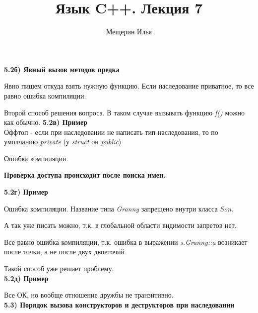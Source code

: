\documentclass{article}
\title{Язык C++. Лекция 7}
\author{Мещерин Илья}
\date{\DTMdate{2018-10-29}}
\begin{document}
\maketitle

\noindent \textbf{5.2б) Явный вызов методов предка}

Явно пишем откуда взять нужную функцию. Если наследование приватное, то все равно ошибка компиляции.

Второй способ решения вопроса. В таком случае вызывать функцию \textit{f()} можно как обычно.
\noindent \textbf{5.2в) Пример}\\
Оффтоп - если при наследовании не написать тип наследования, то по умолчанию \textit{private} (у \textit{struct} он \textit{public})

Ошибка компиляции.\begin{large}
	\textbf{Проверка доступа происходит после поиска имен.}
\end{large}
\noindent \textbf{5.2г) Пример}

Ошибка компиляции. Название типа \textit{Granny} запрещено внутри класса \textit{Son}.

А так уже писать можно, т.к. в глобальной области видимости запретов нет.

Все равно ошибка компиляции, т.к. ошибка в выражении \textit{s.Granny::a} возникает после точки, а не после двух двоеточий.

Такой способ уже решает проблему.\\
\noindent \textbf{5.2д) Пример}

Все ОК, но вообще отношение дружбы не транзитивно.\\
\noindent \textbf{5.3) Порядок вызова конструкторов и деструкторов при наследовании}
\end{document}

